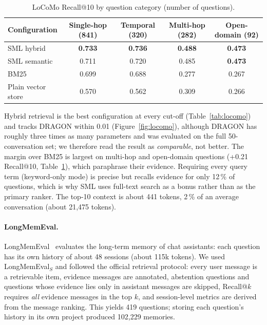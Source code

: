 \documentclass[11pt,a4paper]{article}
\newcommand{\sys}{SML}
\newcommand{\best}[1]{\textbf{#1}}
\begin{document}
\begin{table}[htbp]
\centering
\small
\caption{LoCoMo Recall@10 by question category (number of questions).}
\label{tab:locomocat}
\begin{tabular}{@{}lcccc@{}}
\toprule
Configuration & Single-hop (841) & Temporal (320) & Multi-hop (282) & Open-domain (92) \\
\midrule
\sys{} hybrid & \best{0.733} & \best{0.736} & \best{0.488} & \best{0.473} \\
\sys{} semantic & 0.711 & 0.720 & 0.485 & \best{0.473} \\
BM25 & 0.699 & 0.688 & 0.277 & 0.267 \\
Plain vector store & 0.570 & 0.562 & 0.309 & 0.266 \\
\bottomrule
\end{tabular}
\end{table}

Hybrid retrieval is the best configuration at every cut-off (Table~\ref{tab:locomo}) and tracks DRAGON within
0.01 (Figure~\ref{fig:locomo}), although DRAGON has roughly three times as many parameters and was evaluated
on the full 50-conversation set; we therefore read the result as \emph{comparable}, not better. The margin
over BM25 is largest on multi-hop and open-domain questions (+0.21 Recall@10, Table~\ref{tab:locomocat}), which
paraphrase their evidence. Requiring every query term (keyword-only mode) is precise but recalls evidence for
only 12\,\% of questions, which is why \sys{} uses full-text search as a bonus rather than as the primary
ranker. The top-10 context is about 441 tokens, 2\,\% of an average conversation (about 21{,}475 tokens).

\paragraph{LongMemEval.} LongMemEval~\cite{wu2025longmemeval} evaluates the long-term memory of chat
assistants: each question has its own history of about 48 sessions (about 115k tokens). We used
LongMemEval$_S$ and followed the official retrieval protocol: every user message is a retrievable item,
evidence messages are annotated, abstention questions and questions whose evidence lies only in assistant
messages are skipped, Recall@$k$ requires \emph{all} evidence messages in the top $k$, and session-level
metrics are derived from the message ranking. This yields 419 questions; storing each question's history in
its own project produced 102{,}229 memories.
\end{document}
